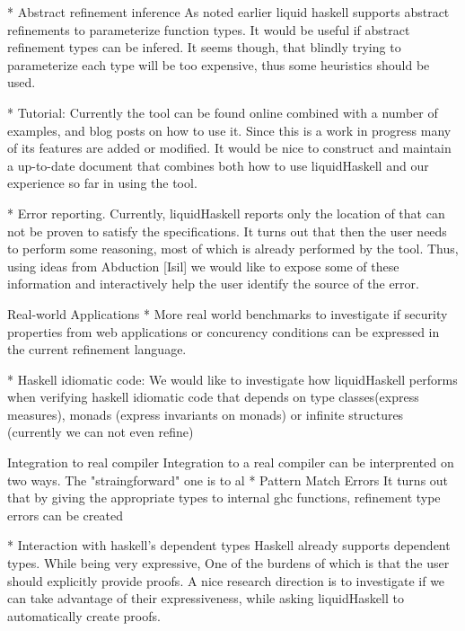 \documentclass[10pt,a4paper]{article}
\begin{document}
* Abstract refinement inference
  As noted earlier liquid haskell supports abstract refinements to parameterize function types.
  It would be useful if abstract refinement types can be infered. 
  It seems though, that blindly trying to parameterize each type will be too expensive, 
  thus some heuristics should be used.


* Tutorial:
  Currently the tool can be found online combined with a number of examples, 
  and blog posts on how to use it.
  Since this is a work in progress many of its features are added or modified.
  It would be nice to construct and maintain a up-to-date document 
  that combines both how to use liquidHaskell and our experience so far in using the tool. 

* Error reporting.
  Currently, liquidHaskell reports only the location of that can not be proven to satisfy the specifications.
  It turns out that then the user needs to perform some reasoning, most of which is already performed 
  by the tool. Thus, using ideas from Abduction [Isil] we would like to expose some of these information
  and interactively help the user identify the source of the error.


Real-world Applications
* More real world benchmarks to investigate if security properties from web applications
  or concurency conditions can be expressed in the current refinement language.


* Haskell idiomatic code: 
  We would like to investigate how liquidHaskell performs when verifying haskell idiomatic 
  code that depends on type classes(express measures), monads (express invariants on monads)
  or infinite structures (currently we can not even refine) 


Integration to real compiler
 Integration to a real compiler can be interprented on two ways.
 The "straingforward" one is to al 
* Pattern Match Errors
  It turns out that by giving the appropriate types to internal ghc functions, refinement type errors can be created
 

* Interaction with haskell's dependent types
  Haskell already supports dependent types. While being very expressive, One of the burdens of which is that the user should
explicitly provide proofs.
  A nice research direction is to investigate if we can take advantage of their expressiveness, while asking liquidHaskell to
  automatically create proofs.
\end{document}
